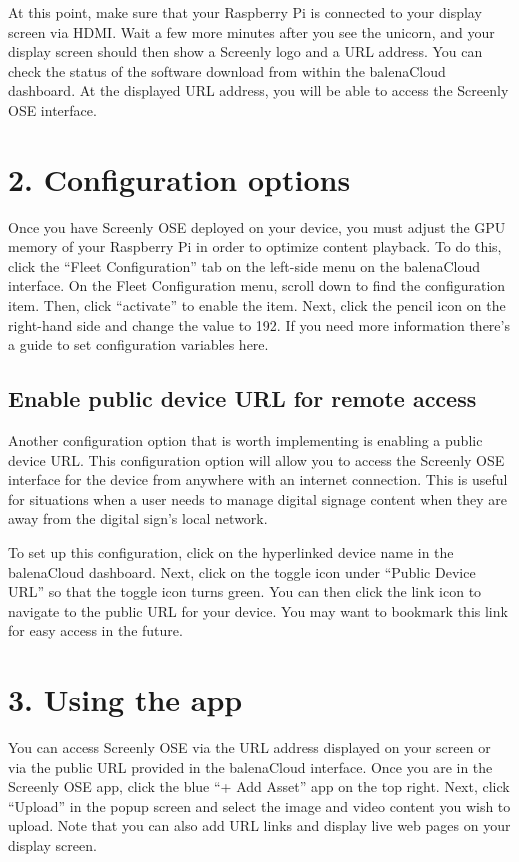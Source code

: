 At this point, make sure that your Raspberry Pi is connected to your display screen via HDMI. Wait a few more minutes after you see the unicorn, and your display screen should then show a Screenly logo and a URL address. You can check the status of the software download from within the balenaCloud dashboard. At the displayed URL address, you will be able to access the Screenly OSE interface. 

\section*{2. Configuration options}

Once you have Screenly OSE deployed on your device, you must adjust the GPU memory of your Raspberry Pi in order to optimize content playback. To do this, click the “Fleet Configuration” tab on the left-side menu on the balenaCloud interface. On the Fleet Configuration menu, scroll down to find the configuration item. Then, click “activate” to enable the item. Next, click the pencil icon on the right-hand side and change the value to 192. If you need more information there's a guide to set configuration variables here.

\subsection*{Enable public device URL for remote access}

Another configuration option that is worth implementing is enabling a public device URL. This configuration option will allow you to access the Screenly OSE interface for the device from anywhere with an internet connection. This is useful for situations when a user needs to manage digital signage content when they are away from the digital sign’s local network.

To set up this configuration, click on the hyperlinked device name in the balenaCloud dashboard. Next, click on the toggle icon under “Public Device URL” so that the toggle icon turns green. You can then click the link icon to navigate to the public URL for your device. You may want to bookmark this link for easy access in the future. 

\section*{3. Using the app}

You can access Screenly OSE via the URL address displayed on your screen or via the public URL provided in the balenaCloud interface. Once you are in the Screenly OSE app, click the blue “+ Add Asset” app on the top right. Next, click “Upload” in the popup screen and select the image and video content you wish to upload. Note that you can also add URL links and display live web pages on your display screen.